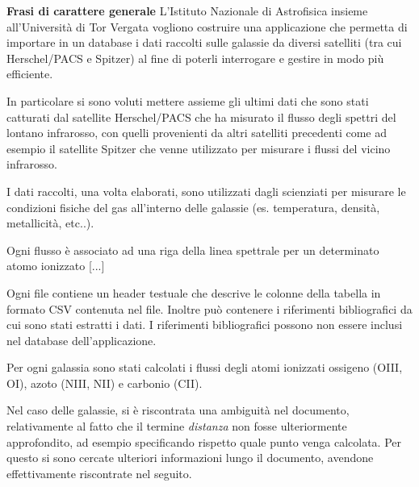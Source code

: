 \documentclass[12pt,a4paper,onecolumn]{article}
\begin{document}
	\begin{framed}
		\begin{flushleft}
			\textbf{Frasi di carattere generale}\newline
			L’Istituto Nazionale di Astrofisica insieme all’Università di Tor Vergata vogliono costruire una applicazione che permetta di importare in un database i dati raccolti sulle galassie da diversi satelliti (tra cui Herschel/PACS e Spitzer) al fine di poterli interrogare e gestire in modo più efficiente.
			\newline
			
			In particolare si sono voluti mettere assieme gli ultimi dati che sono stati catturati dal satellite Herschel/PACS che ha misurato il flusso degli spettri del lontano infrarosso, con quelli provenienti da altri satelliti precedenti come ad esempio il satellite Spitzer che venne utilizzato per misurare i flussi del vicino infrarosso.
			\newline
			
			I dati raccolti, una volta elaborati, sono utilizzati dagli scienziati per misurare le condizioni fisiche del gas all’interno delle galassie (es. temperatura, densità, metallicità, etc..).
			\newline

			Ogni flusso è associato ad una riga della linea spettrale per un determinato atomo ionizzato [...]
			\newline
			
			Ogni file contiene un header testuale che descrive le colonne della tabella in formato CSV contenuta nel file. Inoltre può contenere i riferimenti bibliografici da cui sono stati estratti i dati. I riferimenti bibliografici possono non essere inclusi nel database dell’applicazione.
			\newline
			
			Per ogni galassia sono stati calcolati i flussi degli atomi ionizzati ossigeno (OIII, OI), azoto (NIII, NII) e carbonio (CII).
		\end{flushleft}
	\end{framed}

	Nel caso delle galassie, si è riscontrata una ambiguità nel documento, relativamente al fatto che il termine \textit{distanza} non fosse ulteriormente approfondito, ad esempio specificando rispetto quale punto venga calcolata.
	Per questo si sono cercate ulteriori informazioni lungo il documento, avendone effettivamente riscontrate nel seguito.
	
\end{document}
